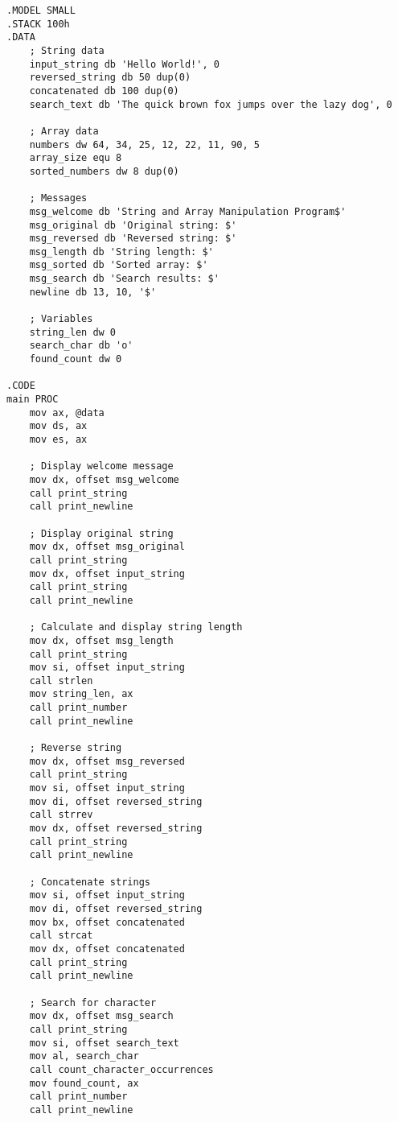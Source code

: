 \documentclass[../main.tex]{subfiles}
\begin{document}
            \begin{lstlisting}[language={[x86masm]Assembler}, caption=Program Manipulasi String dan Array Lengkap, label={lst:complete-program-ch12}]
.MODEL SMALL
.STACK 100h
.DATA
    ; String data
    input_string db 'Hello World!', 0
    reversed_string db 50 dup(0)
    concatenated db 100 dup(0)
    search_text db 'The quick brown fox jumps over the lazy dog', 0
    
    ; Array data
    numbers dw 64, 34, 25, 12, 22, 11, 90, 5
    array_size equ 8
    sorted_numbers dw 8 dup(0)
    
    ; Messages
    msg_welcome db 'String and Array Manipulation Program$'
    msg_original db 'Original string: $'
    msg_reversed db 'Reversed string: $'
    msg_length db 'String length: $'
    msg_sorted db 'Sorted array: $'
    msg_search db 'Search results: $'
    newline db 13, 10, '$'
    
    ; Variables
    string_len dw 0
    search_char db 'o'
    found_count dw 0

.CODE
main PROC
    mov ax, @data
    mov ds, ax
    mov es, ax
    
    ; Display welcome message
    mov dx, offset msg_welcome
    call print_string
    call print_newline
    
    ; Display original string
    mov dx, offset msg_original
    call print_string
    mov dx, offset input_string
    call print_string
    call print_newline
    
    ; Calculate and display string length
    mov dx, offset msg_length
    call print_string
    mov si, offset input_string
    call strlen
    mov string_len, ax
    call print_number
    call print_newline
    
    ; Reverse string
    mov dx, offset msg_reversed
    call print_string
    mov si, offset input_string
    mov di, offset reversed_string
    call strrev
    mov dx, offset reversed_string
    call print_string
    call print_newline
    
    ; Concatenate strings
    mov si, offset input_string
    mov di, offset reversed_string
    mov bx, offset concatenated
    call strcat
    mov dx, offset concatenated
    call print_string
    call print_newline
    
    ; Search for character
    mov dx, offset msg_search
    call print_string
    mov si, offset search_text
    mov al, search_char
    call count_character_occurrences
    mov found_count, ax
    call print_number
    call print_newline
    

\end{lstlisting}
\end{document}
